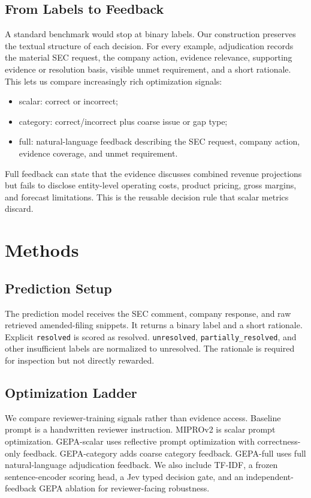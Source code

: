 \documentclass[11pt]{article}
\begin{document}
\subsection{From Labels to Feedback}

A standard benchmark would stop at binary labels. Our construction preserves the textual structure of each decision. For every example, adjudication records the material SEC request, the company action, evidence relevance, supporting evidence or resolution basis, visible unmet requirement, and a short rationale. This lets us compare increasingly rich optimization signals:
\begin{itemize}[leftmargin=*]
    \item scalar: correct or incorrect;
    \item category: correct/incorrect plus coarse issue or gap type;
    \item full: natural-language feedback describing the SEC request, company action, evidence coverage, and unmet requirement.
\end{itemize}
Full feedback can state that the evidence discusses combined revenue projections but fails to disclose entity-level operating costs, product pricing, gross margins, and forecast limitations. This is the reusable decision rule that scalar metrics discard.

\section{Methods}

\subsection{Prediction Setup}

The prediction model receives the SEC comment, company response, and raw retrieved amended-filing snippets. It returns a binary label and a short rationale. Explicit \texttt{resolved} is scored as resolved. \texttt{unresolved}, \texttt{partially\_resolved}, and other insufficient labels are normalized to unresolved. The rationale is required for inspection but not directly rewarded.

\subsection{Optimization Ladder}

We compare reviewer-training signals rather than evidence access. Baseline prompt is a handwritten reviewer instruction. MIPROv2 is scalar prompt optimization. GEPA-scalar uses reflective prompt optimization with correctness-only feedback. GEPA-category adds coarse category feedback. GEPA-full uses full natural-language adjudication feedback. We also include TF-IDF, a frozen sentence-encoder scoring head, a Jev typed decision gate, and an independent-feedback GEPA ablation for reviewer-facing robustness.
\end{document}
